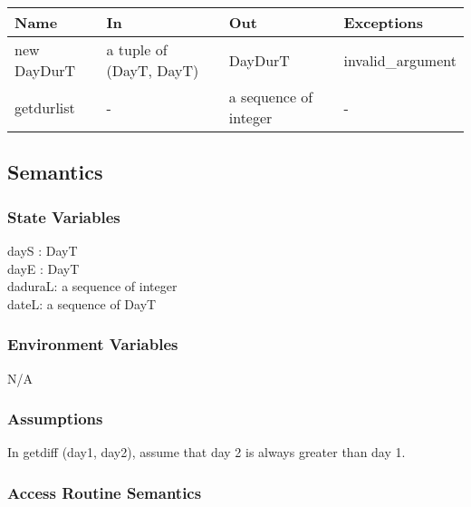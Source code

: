 \documentclass[12pt, titlepage]{article}
\begin{document}
\begin{center}
\begin{tabular}{p{3cm} p{5cm} p{4cm} p{2cm}}
\hline
\textbf{Name} & \textbf{In} & \textbf{Out} & \textbf{Exceptions} \\
\hline
new DayDurT& a tuple of (DayT, DayT)  & DayDurT & invalid\_argument \\
getdurlist &  -  & a sequence of integer & - \\

\hline
\end{tabular}
\end{center}


\subsection{Semantics}

\subsubsection{State Variables}
dayS : DayT \\
dayE : DayT\\
daduraL: a sequence of integer\\
dateL: a sequence of DayT\\
\subsubsection{Environment Variables}

N/A\\

\subsubsection{Assumptions}
In  getdiff (day1, day2), assume that day 2 is always greater than day 1.

\subsubsection{ Access Routine Semantics}
\end{document}
